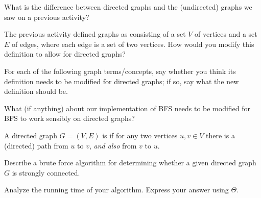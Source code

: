 \documentclass{tufte-handout}
\begin{document}
\begin{questions}
  \item What is the difference between directed graphs and the
    (undirected) graphs we saw on a previous activity?
  \item The previous activity defined graphs as consisting of a set
    $V$ of vertices and a set $E$ of edges, where each edge is a set
    of two vertices.  How would you modify this definition to allow
    for directed graphs?
  \item For each of the following graph terms/concepts, say whether
    you think its definition needs to be modified for directed graphs;
    if so, say what the new definition should be.
    \begin{questions}
    \item {}
    \item {}
    \item {}
    \item {}
    \end{questions}
  \item What (if anything) about our implementation of BFS needs to be
    modified for BFS to work sensibly on directed graphs?
\end{questions}

\newpage
\begin{defn}
  A directed graph $G = (V,E)$ is  if for any two
  vertices $u,v \in V$ there is a (directed) path from $u$ to $v$,
  \emph{and also} from $v$ to $u$.
\end{defn}

\begin{questions}
  \item Describe a brute force algorithm for determining whether a
    given directed graph $G$ is strongly connected.
  \item Analyze the running time of your algorithm. Express your
    answer using $\Theta$.
\end{questions}


\end{document}
